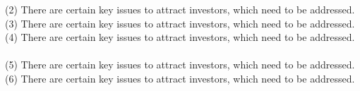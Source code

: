 \documentclass[11pt,a4paper]{article}
\begin{document}
(2) There are certain key issues to attract
investors, which need to be addressed.\linebreak
(3) There are certain key issues to attract
investors, which need to be addressed.\\
(4) There are certain key issues to attract
investors, which need to be addressed.\\\\
(5) There are certain key issues to attract
investors, which need to be addressed.
(6) There are certain key issues to attract
investors, which need to be addressed.
\end{document}
